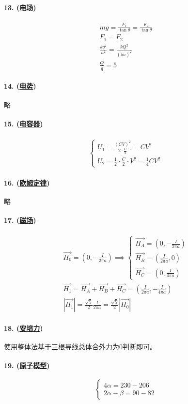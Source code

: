 \paragraph{13. (\hyperref[subsec:电场]{电场})}

\begin{gather*}
    mg=\frac{F_1}{\tan\theta}=\frac{F_2}{\tan\theta}\\
    F_1=F_2\\
    \frac{kq^2}{a^2}=\frac{kQ^2}{(5a)^2}\\
    \frac{Q}{q}=5
\end{gather*}

\paragraph{14. (\hyperref[subsec:电势]{电势})} 略
\paragraph{15. (\hyperref[subsec:电容器]{电容器})}

\begin{gather*}
    \begin{cases}
        U_1=\frac{(CV)^2}{2\cdot\frac{C}{2}}=CV^2\\
        U_2=\frac12\cdot\frac{C}{2}\cdot V^2=\frac14CV^2
    \end{cases}
\end{gather*}

\paragraph{16. (\hyperref[subsec:欧姆定律]{欧姆定律})} 略
\paragraph{17. (\hyperref[subsec:磁场]{磁场})}

\begin{gather*}
    \vec{H_0}=\left(0,-\frac{I}{2\pi a}\right)\implies
    \begin{cases}
        \vec{H_A}=\left(0,-\frac{I}{2\pi a}\right)\\
        \vec{H_B}=\left(\frac{I}{2\pi a},0\right)\\
        \vec{H_C}=\left(0,\frac{I}{4\pi a}\right)
    \end{cases}\\
    \vec{H_1}=\vec{H_A}+\vec{H_B}+\vec{H_C}=\left(\frac{I}{2\pi a},-\frac{I}{4\pi a}\right)\\
    |\vec{H_1}|=\frac{\sqrt{5}}{2}\frac{I}{2\pi a}=\frac{\sqrt{5}}{2}|\vec{H_0}|
\end{gather*}

\paragraph{18. (\hyperref[subsec:安培力]{安培力})} 使用整体法基于三根导线总体合外力为0判断即可。
\paragraph{19. (\hyperref[sec:原子模型]{原子模型})}

\begin{equation*}
    \begin{cases}
        4\alpha=230-206\\
        2\alpha-\beta=90-82
    \end{cases}
\end{equation*}
